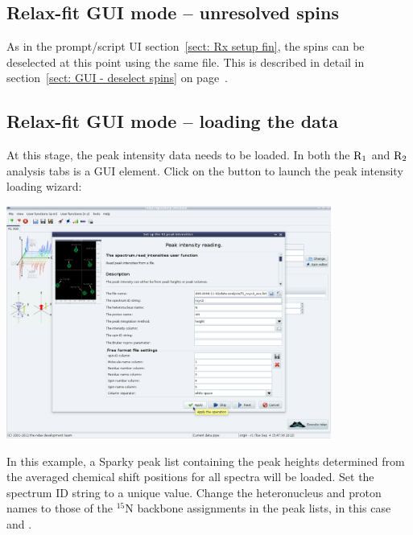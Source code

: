 
\subsection{Relax-fit GUI mode -- unresolved spins}

As in the prompt/script UI section~\ref{sect: Rx setup fin}, the spins can be deselected at this point using the same  file.  This is described in detail in section~\ref{sect: GUI - deselect spins} on page~\pageref{sect: GUI - deselect spins}.




\subsection{Relax-fit GUI mode -- loading the data}

At this stage, the peak intensity data needs to be loaded.  In both the $\mathrm{R}_1$ and $\mathrm{R}_2$ analysis tabs is a  GUI element.  Click on the  button to launch the peak intensity loading wizard:

\begin{minipage}[h]{\linewidth}
\centerline{\includegraphics[width=0.8\textwidth, bb=14 14 1415 1019]{graphics/screenshots/r1_analysis/peak_intensity_bb_peaks}}
\end{minipage}

In this example, a Sparky peak list containing the peak heights determined from the averaged chemical shift positions for all spectra will be loaded.  Set the spectrum ID string to a unique value.  Change the heteronucleus and proton names to those of the $^{15}$N backbone assignments in the peak lists, in this case  and .

